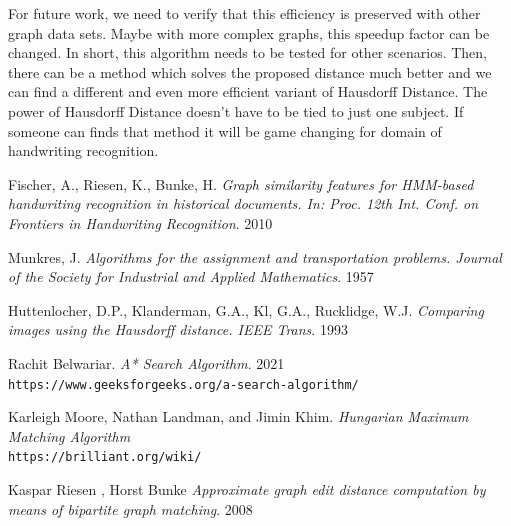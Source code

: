 \documentclass{article}
\begin{document}
For future work, we need to verify that this efficiency is preserved with other graph data sets. Maybe with more complex graphs, this speedup factor can be changed. In short, this algorithm needs to be tested for other scenarios. Then, there can be a method which solves the proposed distance much better and we can find a different and even more efficient variant of Hausdorff Distance. The power of Hausdorff Distance doesn't have to be tied to just one subject. If someone can finds that method it will be game changing for domain of handwriting recognition.  

\clearpage

\begin{thebibliography}{9}

Fischer, A., Riesen, K., Bunke, H.
\textit{Graph similarity features for HMM-based
handwriting recognition in historical documents. In: Proc. 12th Int. Conf. on
Frontiers in Handwriting Recognition}. 2010

Munkres, J.
\textit{Algorithms for the assignment and transportation problems. Journal
of the Society for Industrial and Applied Mathematics}. 1957

Huttenlocher, D.P., Klanderman, G.A., Kl, G.A., Rucklidge, W.J.
\textit{Comparing
images using the Hausdorff distance. IEEE Trans}. 1993

Rachit Belwariar.
\textit{A* Search Algorithm}. 2021
\\\texttt{https://www.geeksforgeeks.org/a-search-algorithm/}

Karleigh Moore, Nathan Landman, and Jimin Khim. 
\textit{Hungarian Maximum Matching Algorithm}
\\\texttt{https://brilliant.org/wiki/}

Kaspar Riesen , Horst Bunke 
\textit{Approximate graph edit distance computation by means of bipartite graph matching}. 2008


\end{thebibliography}
\end{document}
